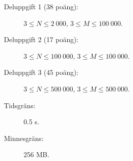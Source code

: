 \documentclass{boi2014-se}
\begin{document}
    \Scoring

    \begin{description}
        \item[Deluppgift 1 (38 poäng):] $3 \le N \le 2\ 000$, $3 \le M \le 100\ 000$.
        \item[Deluppgift 2 (17 poäng):] $3 \le N \le 100\ 000$, $3 \le M \le 100\ 000$.
        \item[Deluppgift 3 (45 poäng):] $3 \le N \le 500\ 000$, $3 \le M \le 500\ 000$.
    \end{description}

    \Constraints

    \begin{description}
        \item[Tidsgräns:] 0.5 s.
        \item[Minnesgräns:] 256 MB.
    \end{description}
\end{document}
